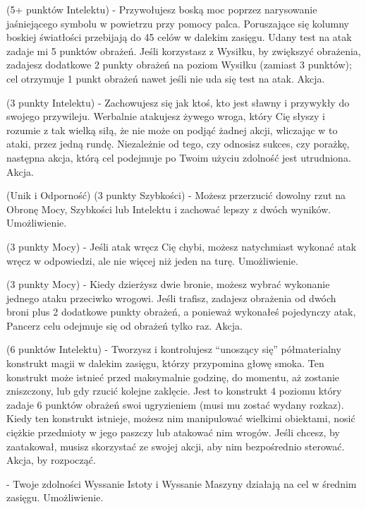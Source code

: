 { (5+ punktów Intelektu) - Przywołujesz boską moc poprzez narysowanie jaśniejącego symbolu w powietrzu przy pomocy palca. Poruszające się kolumny boskiej światłości przebijają do 45 celów w dalekim zasięgu. Udany test na atak zadaje mi 5 punktów obrażeń. Jeśli korzystasz z Wysiłku, by zwiększyć obrażenia, zadajesz dodatkowe 2 punkty obrażeń na poziom Wysiłku (zamiast 3 punktów); cel otrzymuje 1 punkt obrażeń nawet jeśli nie uda się test na atak. Akcja.

  (3 punkty Intelektu) - Zachowujesz się jak ktoś, kto jest sławny i przywykły do swojego przywileju. Werbalnie atakujesz żywego wroga, który Cię słyszy i rozumie z tak wielką siłą, że nie może on podjąć żadnej akcji, wliczając w to ataki, przez jedną rundę. Niezależnie od tego, czy odnosisz sukces, czy porażkę, następna akcja, którą cel podejmuje po Twoim użyciu zdolność jest utrudniona. Akcja.
 
 \myability(Unik i Odporność) (3 punkty Szybkości) - Możesz przerzucić dowolny rzut na Obronę Mocy, Szybkości lub Intelektu i zachować lepszy z dwóch wyników. Umożliwienie. 
 
  (3 punkty Mocy) - Jeśli atak wręcz Cię chybi, możesz natychmiast wykonać atak wręcz w odpowiedzi, ale nie więcej niż jeden na turę. Umożliwienie. 
 
  (3 punkty Mocy) - Kiedy dzierżysz dwie bronie, możesz wybrać wykonanie jednego ataku przeciwko wrogowi. Jeśli trafisz, zadajesz obrażenia od dwóch broni plus 2 dodatkowe punkty obrażeń, a ponieważ wykonałeś pojedynczy atak, Pancerz celu odejmuje się od obrażeń tylko raz. Akcja.

 (6 punktów Intelektu) - Tworzysz i kontrolujesz ``unoszący się'' półmaterialny konstrukt  magii w dalekim zasięgu, którzy przypomina głowę smoka. Ten konstrukt może istnieć przed maksymalnie godzinę, do momentu, aż zostanie zniszczony, lub gdy rzucić kolejne zaklęcie. Jest to konstrukt 4 poziomu który zadaje 6 punktów obrażeń swoi ugryzieniem (musi mu zostać wydany rozkaz). Kiedy ten konstrukt istnieje, możesz nim manipulować wielkimi obiektami, nosić ciężkie przedmioty w jego paszczy lub atakować nim wrogów. Jeśli chcesz, by zaatakował, musisz skorzystać ze swojej akcji, aby nim bezpośrednio sterować. Akcja, by rozpocząć. 

  - Twoje zdolności Wyssanie Istoty i Wyssanie Maszyny działają na cel w średnim zasięgu. Umożliwienie.

}
